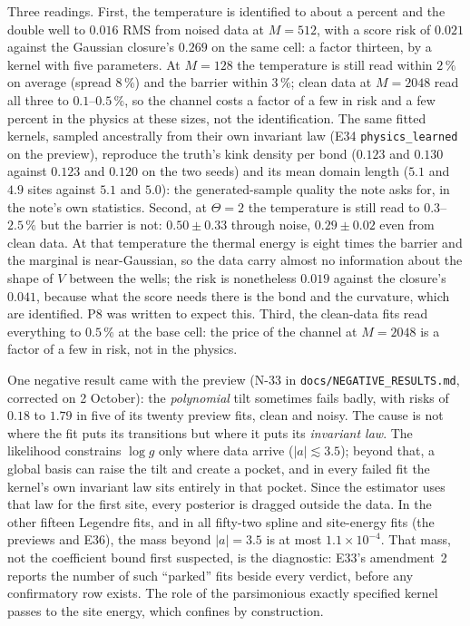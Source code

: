 \documentclass[10pt,a4paper]{article}
\newcommand{\Th}{\Theta}
\newcommand{\code}[1]{\texttt{\small #1}}
\theoremstyle{plain}
\theoremstyle{remark}
\begin{document}
Three readings. First, the temperature is identified to about a percent and the double well to
$0.016$ RMS from noised data at $M=512$, with a score risk of $0.021$ against the Gaussian closure's
$0.269$ on the same cell: a factor thirteen, by a kernel with five parameters. At $M=128$ the
temperature is still read within $2\,\%$ on average (spread $8\,\%$) and the barrier within $3\,\%$;
clean data at $M=2048$ read all three to $0.1$--$0.5\,\%$, so the channel costs a factor of a few in
risk and a few percent in the physics at these sizes, not the identification. The same fitted
kernels, sampled ancestrally from their own invariant law (E34 \code{physics\_learned} on the
preview), reproduce the truth's kink density per bond ($0.123$ and $0.130$ against $0.123$ and
$0.120$ on the two seeds) and its mean domain length ($5.1$ and $4.9$ sites against $5.1$ and $5.0$):
the generated-sample quality the note asks for, in the note's own statistics. Second, at $\Th=2$
the temperature is still read to $0.3$--$2.5\,\%$ but the barrier is not: $0.50\pm0.33$ through
noise, $0.29\pm0.02$ even from clean data. At that temperature the thermal energy is eight times
the barrier and the marginal is near-Gaussian, so the data carry almost no information about the
shape of $V$ between the wells; the risk is nonetheless $0.019$ against the closure's $0.041$,
because what the score needs there is the bond and the curvature, which are identified. P8 was
written to expect this. Third, the clean-data fits read everything to $0.5\,\%$ at the base cell:
the price of the channel at $M=2048$ is a factor of a few in risk, not in the physics.

One negative result came with the preview (N-33 in \code{docs/NEGATIVE\_RESULTS.md}, corrected on
2 October): the \emph{polynomial} tilt sometimes fails badly, with risks of $0.18$ to $1.79$ in five of its
twenty preview fits, clean and noisy. The cause is not where the fit puts its transitions but where
it puts its \emph{invariant law}. The likelihood constrains $\log g$ only where data arrive
($|a|\lesssim3.5$); beyond that, a global basis can raise the tilt and create a pocket, and in every failed fit
the kernel's own invariant law sits entirely in that pocket. Since the estimator uses that law for the
first site, every posterior is dragged outside the data. In the other fifteen Legendre fits, and in all
fifty-two spline and site-energy fits (the previews and E36), the mass beyond $|a|=3.5$ is at most $1.1\times10^{-4}$. That mass, not the
coefficient bound first suspected, is the diagnostic: E33's amendment~2 reports the number of such
``parked'' fits beside every verdict, before any confirmatory row exists. The role of the parsimonious
exactly specified kernel passes to the site energy, which confines by construction.
\end{document}
